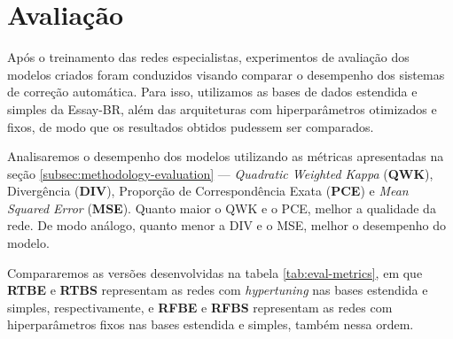 \section{Avaliação}
\label{sec:evaluate}

Após o treinamento das redes especialistas, experimentos de avaliação dos modelos criados foram conduzidos visando comparar o desempenho dos sistemas de correção automática. Para isso, utilizamos as bases de dados estendida e simples da Essay-BR, além das arquiteturas com hiperparâmetros otimizados e fixos, de modo que os resultados obtidos pudessem ser comparados.

Analisaremos o desempenho dos modelos utilizando as métricas apresentadas na seção \ref{subsec:methodology-evaluation} --- \textit{Quadratic Weighted Kappa} (\textbf{QWK}), Divergência (\textbf{DIV}), Proporção de Correspondência Exata (\textbf{PCE}) e \textit{Mean Squared Error} (\textbf{MSE}). Quanto maior o QWK e o PCE, melhor a qualidade da rede. De modo análogo, quanto menor a DIV e o MSE, melhor o desempenho do modelo.

Compararemos as versões desenvolvidas na tabela \ref{tab:eval-metrics}, em que \textbf{RTBE} e \textbf{RTBS} representam as redes com \textit{hypertuning} nas bases estendida e simples, respectivamente, e \textbf{RFBE} e \textbf{RFBS} representam as redes com hiperparâmetros fixos nas bases estendida e simples, também nessa ordem.

